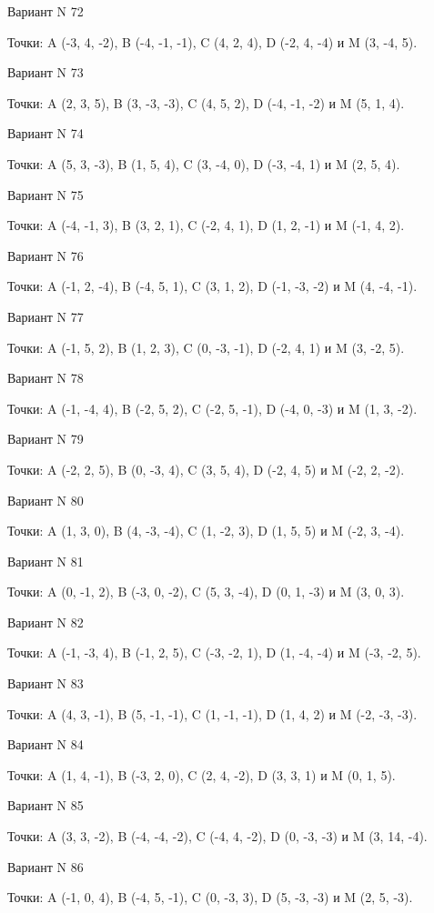 \documentclass[11pt]{report}
\begin{document}
Вариант N 72

Точки: A (-3, 4, -2), B (-4, -1, -1), C (4, 2, 4), D (-2, 4, -4) и M (3, -4, 5).

Вариант N 73

Точки: A (2, 3, 5), B (3, -3, -3), C (4, 5, 2), D (-4, -1, -2) и M (5, 1, 4).

Вариант N 74

Точки: A (5, 3, -3), B (1, 5, 4), C (3, -4, 0), D (-3, -4, 1) и M (2, 5, 4).

Вариант N 75

Точки: A (-4, -1, 3), B (3, 2, 1), C (-2, 4, 1), D (1, 2, -1) и M (-1, 4, 2).

Вариант N 76

Точки: A (-1, 2, -4), B (-4, 5, 1), C (3, 1, 2), D (-1, -3, -2) и M (4, -4, -1).

Вариант N 77

Точки: A (-1, 5, 2), B (1, 2, 3), C (0, -3, -1), D (-2, 4, 1) и M (3, -2, 5).

Вариант N 78

Точки: A (-1, -4, 4), B (-2, 5, 2), C (-2, 5, -1), D (-4, 0, -3) и M (1, 3, -2).

Вариант N 79

Точки: A (-2, 2, 5), B (0, -3, 4), C (3, 5, 4), D (-2, 4, 5) и M (-2, 2, -2).

Вариант N 80

Точки: A (1, 3, 0), B (4, -3, -4), C (1, -2, 3), D (1, 5, 5) и M (-2, 3, -4).
\newpage


Вариант N 81

Точки: A (0, -1, 2), B (-3, 0, -2), C (5, 3, -4), D (0, 1, -3) и M (3, 0, 3).

Вариант N 82

Точки: A (-1, -3, 4), B (-1, 2, 5), C (-3, -2, 1), D (1, -4, -4) и M (-3, -2, 5).

Вариант N 83

Точки: A (4, 3, -1), B (5, -1, -1), C (1, -1, -1), D (1, 4, 2) и M (-2, -3, -3).

Вариант N 84

Точки: A (1, 4, -1), B (-3, 2, 0), C (2, 4, -2), D (3, 3, 1) и M (0, 1, 5).

Вариант N 85

Точки: A (3, 3, -2), B (-4, -4, -2), C (-4, 4, -2), D (0, -3, -3) и M (3, 14, -4).

Вариант N 86

Точки: A (-1, 0, 4), B (-4, 5, -1), C (0, -3, 3), D (5, -3, -3) и M (2, 5, -3).
\end{document}
